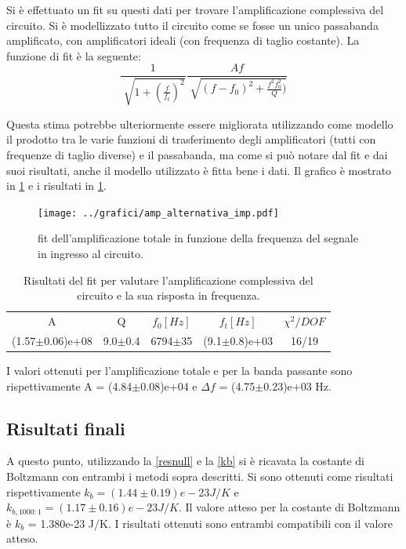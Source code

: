 \documentclass[a4paper,10pt]{article}
\begin{document}
Si è effettuato un fit su questi dati per trovare l'amplificazione complessiva del circuito. Si è modellizzato tutto il circuito come se fosse un unico passabanda amplificato, con amplificatori ideali (con frequenza di taglio costante). La funzione di fit è la seguente:
\begin{equation}
\frac{1}{\sqrt[]{1+(\frac{f}{f_t})^2}} \frac{A f}{\sqrt[]{(f - f_0)^2+ \frac{f^2 f_0^2}{Q} )}} 
\end{equation}

Questa stima potrebbe ulteriormente essere migliorata utilizzando come modello il prodotto tra le varie funzioni di trasferimento degli amplificatori (tutti con frequenze di taglio diverse) e il passabanda, ma come si può notare dal fit e dai suoi risultati, anche il modello utilizzato è fitta bene i dati. Il grafico è mostrato in \cref{fig:ampltot} e i risultati in \cref{tab:risult}.

\begin{figure}[H]
	\centering
	\texttt{[image: ../grafici/amp\_alternativa\_imp.pdf]}
	\caption{fit dell'amplificazione totale in funzione della frequenza del segnale in ingresso al circuito.}
	\label{fig:ampltot}
\end{figure}

\begin{table}[H]
	\centering
	\begin{tabular}{ccccc}
		\hline
A & Q & $f_0[Hz]$ & $f_t[Hz]$ & $\chi^2/DOF$ \\
(1.57$\pm$0.06)e+08 & 9.0$\pm$0.4 & 6794$\pm$35 & (9.1$\pm$0.8)e+03 & 16/19 \\
\hline
	\end{tabular}
	\caption{Risultati del fit per valutare l'amplificazione complessiva del circuito e la sua risposta in frequenza.}
	\label{tab:risult}
\end{table}

I valori ottenuti per l'amplificazione totale e per la banda passante sono rispettivamente A = (4.84$\pm$0.08)e+04 e $\Delta f$ = (4.75$\pm$0.23)e+03 Hz.



\subsection{Risultati finali}
A questo punto, utilizzando la \eqref{resnull} e la \eqref{kb} si è ricavata la costante di Boltzmann con entrambi i metodi sopra descritti. Si sono ottenuti come risultati rispettivamente $k_b = (1.44\pm0.19)e-23 J/K$ e $k_{b,1000:1} = (1.17\pm0.16)e-23 J/K $. Il valore atteso per la costante di Boltzmann è $k_b$ = 1.380e-23 J/K. I risultati ottenuti sono entrambi compatibili con il valore atteso. 
\end{document}
